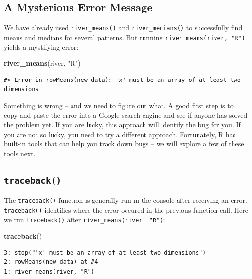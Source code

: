 \documentclass[
]{book}
\newenvironment{Shaded}{\begin{snugshade}}{\end{snugshade}}
\newcommand{\KeywordTok}[1]{\textcolor[rgb]{0.13,0.29,0.53}{\textbf{#1}}}
\newcommand{\NormalTok}[1]{#1}
\newcommand{\StringTok}[1]{\textcolor[rgb]{0.31,0.60,0.02}{#1}}
\begin{document}
\hypertarget{error-onematch}{%
\subsection{A Mysterious Error Message}\label{error-onematch}}

We have already used \texttt{river\_means()} and \texttt{river\_medians()} to successfully find means and medians for several patterns. But running \texttt{river\_means(river,\ "R")} yields a mystifying error:

\begin{Shaded}
\begin{Highlighting}[]
\KeywordTok{river_means}\NormalTok{(river, }\StringTok{"R"}\NormalTok{)}
\end{Highlighting}
\end{Shaded}

\begin{verbatim}
#> Error in rowMeans(new_data): 'x' must be an array of at least two dimensions
\end{verbatim}

Something is wrong -- and we need to figure out what. A good first step is to copy and paste the error into a Google search engine and see if anyone has solved the problem yet. If you are lucky, this approach will identify the bug for you. If you are not so lucky, you need to try a different approach. Fortunately, R has built-in tools that can help you track down bugs -- we will explore a few of these tools next.

\hypertarget{traceback}{%
\subsection{\texorpdfstring{\texttt{traceback()}}{traceback()}}\label{traceback}}

The \texttt{traceback()} function is generally run in the console after receiving an error. \texttt{traceback()} identifies where the error occured in the previous function call. Here we run \texttt{traceback()} after \texttt{river\_means(river,\ "R")}:

\begin{Shaded}
\begin{Highlighting}[]
\KeywordTok{traceback}\NormalTok{()}
\end{Highlighting}
\end{Shaded}

\begin{verbatim}
3: stop("'x' must be an array of at least two dimensions")
2: rowMeans(new_data) at #4
1: river_means(river, "R")
\end{verbatim}
\end{document}
